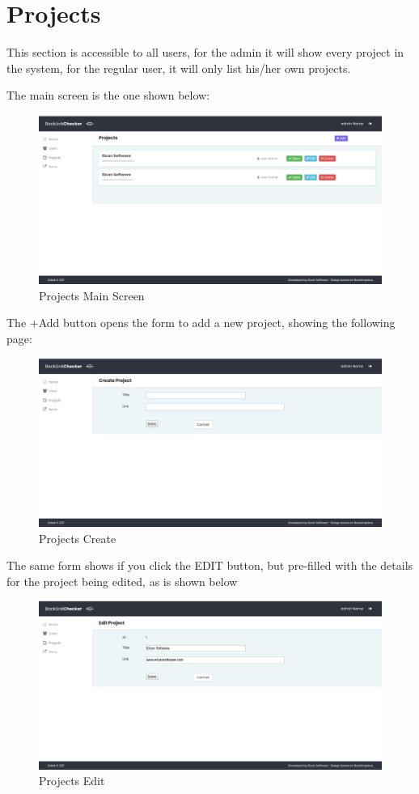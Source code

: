 \section{Projects}
This section is accessible to all users, for the admin it will show every project in the system, for the regular user, it will only list his/her own projects.

The main screen is the one shown below:
\begin{figure}[H]
	\caption{Projects Main Screen}
	\label{img:prjmain}
	\includegraphics[width=\textwidth]{images/projects_screenshot}
\end{figure}

The +Add button opens the form to add a new project, showing the following page:
\begin{figure}[H]
	\caption{Projects Create}
	\label{img:prjcreate}
	\includegraphics[width=\textwidth]{images/project_create}
\end{figure}

The same form shows if you click the EDIT button, but pre-filled with the details for the project being edited, as is shown below
\begin{figure}[H]
	\caption{Projects Edit}
	\label{img:prjedit}
	\includegraphics[width=\textwidth]{images/project_edit}
\end{figure}


